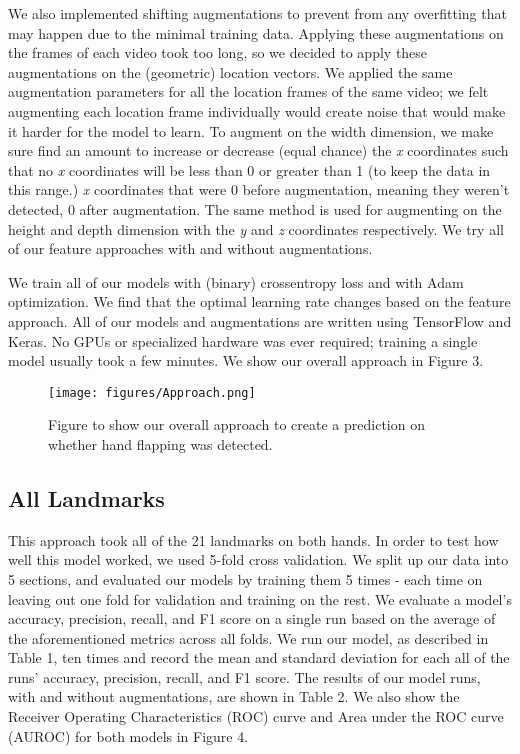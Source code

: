 \documentclass{article}
\begin{document}
We also implemented shifting augmentations to prevent from any overfitting that may happen due to the minimal training data. Applying these augmentations on the frames of each video took too long, so we decided to apply these augmentations on the (geometric) location vectors. We applied the same augmentation parameters for all the location frames of the same video; we felt augmenting each location frame individually would create noise that would make it harder for the model to learn. To augment on the width dimension, we make sure find an amount to increase or decrease (equal chance) the \emph{x} coordinates such that no \emph{x} coordinates will be less than 0 or greater than 1 (to keep the data in this range.) \emph{x} coordinates that were 0 before augmentation, meaning they weren't detected, 0 after augmentation. The same method is used for augmenting on the height and depth dimension with the \emph{y} and \emph{z} coordinates respectively. We try all of our feature approaches with and without augmentations. 

We train all of our models with (binary) crossentropy loss and with Adam optimization. We find that the optimal learning rate changes based on the feature approach. All of our models and augmentations are written using TensorFlow and Keras. No GPUs or specialized hardware was ever required; training a single model usually took a few minutes. We show our overall approach in Figure 3. 

\begin{figure}[h!]
\centering
\texttt{[image: figures/Approach.png]}
\caption{Figure to show our overall approach to create a prediction on whether hand flapping was detected.}
\label{fig:method}
\end{figure}

\newpage

\subsection{All Landmarks}

This approach took all of the 21 landmarks on both hands. In order to test how well this model worked, we used 5-fold cross validation. We split up our data into 5 sections, and evaluated our models by training them 5 times - each time on leaving out one fold for validation and training on the rest. We evaluate a model's accuracy, precision, recall, and F1 score on a single run based on the average of the aforementioned metrics across all folds. We run our model, as described in Table 1, ten times and record the mean and standard deviation for each all of the runs' accuracy, precision, recall, and F1 score. The results of our model runs, with and without augmentations, are shown in Table 2. We also show the Receiver Operating Characteristics (ROC) curve and Area under the ROC curve (AUROC) for both models in Figure 4. 
\end{document}
